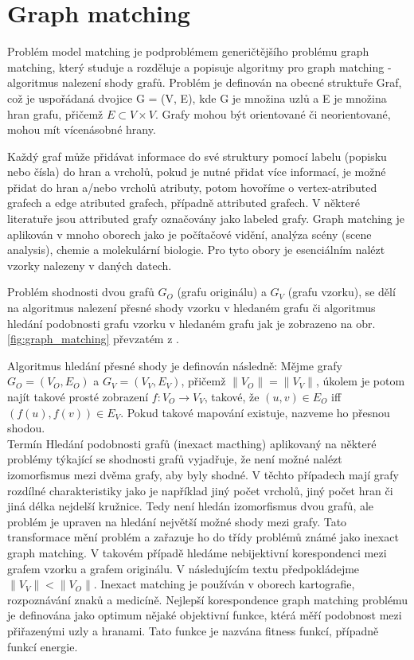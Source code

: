 \documentclass[11pt,twoside,a4paper]{book}
\begin{document}
\section{Graph matching}
 Problém model matching je podproblémem generičtějšího problému graph matching, 
 který studuje \cite{bengoetxeaPHD02} a rozděluje a popisuje algoritmy pro
 graph matching - algoritmus nalezení shody grafů. Problém je definován na
 obecné struktuře Graf, což je uspořádaná dvojice G = (V, E), kde G je množina
 uzlů a E je množina hran grafu, přičemž $E \subset V \times V$. Grafy mohou
 být orientované či neorientované, mohou mít vícenásobné hrany.
 
 Každý graf může přidávat informace do své struktury pomocí labelu (popisku
 nebo čísla) do hran a vrcholů, pokud je nutné přidat více informací, je možné
 přidat do hran a/nebo vrcholů atributy, potom hovoříme o vertex-atributed
 grafech a edge atributed grafech, případně attributed grafech. V některé
 literatuře jsou attributed grafy označovány jako labeled grafy. Graph
 matching je aplikován v mnoho oborech jako je počítačové vidění, analýza
 scény (scene analysis), chemie a molekulární biologie. Pro tyto obory je
 esenciálním nalézt vzorky nalezeny v daných datech. 
  
 Problém shodnosti dvou grafů $G_O$ (grafu originálu) a $G_V$ (grafu
 vzorku), se dělí na algoritmus nalezení přesné shody vzorku v hledaném grafu
 či algoritmus hledání podobnosti grafu vzorku v hledaném grafu jak je zobrazeno
 na obr. \ref{fig:graph_matching} převzatém z \cite{bengoetxeaPHD02}.
 
 Algoritmus hledání přesné shody je definován následně: Mějme grafy $G_O = (V_O
 , E_O)$ a $G_V = (V_V, E_V)$, přičemž $\| V_O\| = \| V_V\|$, úkolem je potom
 najít takové prosté zobrazení  $f: V_O \rightarrow V_V$, takové, že $(u, v) \in
 E_O$ iff $(f(u), f(v)) \in E_V$. Pokud takové mapování existuje, nazveme ho
 přesnou shodou. \\
 
 Termín Hledání podobnosti grafů (inexact macthing) aplikovaný na některé
 problémy týkající se shodnosti grafů vyjadřuje, že není možné nalézt
 izomorfismus mezi dvěma grafy, aby byly shodné. V těchto případech mají grafy
 rozdílné charakteristiky jako je například jiný počet vrcholů, jiný počet hran
 či jiná délka nejdelší kružnice.
 Tedy není hledán izomorfismus dvou grafů, ale problém je upraven na hledání
 největší možné shody mezi grafy.
 Tato transformace mění problém a zařazuje ho do třídy problémů známé jako
 inexact graph matching.
 V takovém případě hledáme nebijektivní korespondenci mezi grafem vzorku a grafem
 originálu. V následujícím textu předpokládejme $\|V_V\| < \|V_O\|$. Inexact
 matching je používán v oborech kartografie, rozpoznávání znaků a medicíně.
 Nejlepší korespondence graph matching problému je definována jako optimum
 nějaké objektivní funkce, ktérá měří podobnost mezi přiřazenými uzly a
 hranami. Tato funkce je nazvána fitness funkcí, případně funkcí energie.
\end{document}
